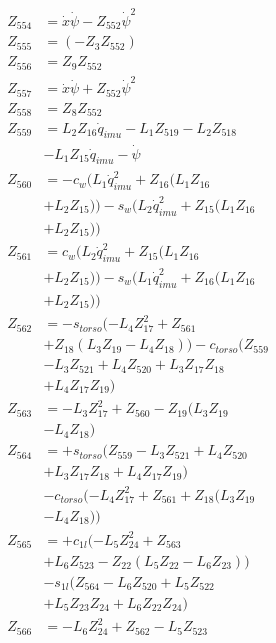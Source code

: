 \begin{multicols}{2}
\begin{align}
Z_{554} &= \dot{x}\dot{\psi} - Z_{552}\dot{\psi}^2 \nonumber \\
Z_{555} &= (-Z_{3}Z_{552}) \nonumber \\
Z_{556} &= Z_{9}Z_{552} \nonumber \\
Z_{557} &= \dot{x}\dot{\psi} + Z_{552}\dot{\psi}^2 \nonumber \\
Z_{558} &= Z_{8}Z_{552} \nonumber \\
Z_{559} &= L_2Z_{16}\dot{q}_{imu} - L_1Z_{519} - L_2Z_{518}  \nonumber \\
&- L_1Z_{15}\dot{q}_{imu} - \dot{\psi} \nonumber \\
Z_{560} &= - c_{w}(L_1\dot{q}_{imu}^2 + Z_{16}(L_1Z_{16}  \nonumber \\
&+ L_2Z_{15})) - s_{w}(L_2\dot{q}_{imu}^2 + Z_{15}(L_1Z_{16}  \nonumber \\
&+ L_2Z_{15})) \nonumber \\
Z_{561} &= c_{w}(L_2\dot{q}_{imu}^2 + Z_{15}(L_1Z_{16}  \nonumber \\
&+ L_2Z_{15})) - s_{w}(L_1\dot{q}_{imu}^2 + Z_{16}(L_1Z_{16}  \nonumber \\
&+ L_2Z_{15})) \nonumber \\
Z_{562} &= - s_{torso}(- L_4Z_{17}^2 + Z_{561}  \nonumber \\
&+ Z_{18}(L_3Z_{19} - L_4Z_{18})) - c_{torso}(Z_{559}  \nonumber \\
&- L_3Z_{521} + L_4Z_{520} + L_3Z_{17}Z_{18}  \nonumber \\
&+ L_4Z_{17}Z_{19}) \nonumber \\
Z_{563} &= - L_3Z_{17}^2 + Z_{560} - Z_{19}(L_3Z_{19}  \nonumber \\
&- L_4Z_{18}) \nonumber \\
Z_{564} &= + s_{torso}(Z_{559} - L_3Z_{521} + L_4Z_{520}  \nonumber \\
&+ L_3Z_{17}Z_{18} + L_4Z_{17}Z_{19})  \nonumber \\
&- c_{torso}(- L_4Z_{17}^2 + Z_{561} + Z_{18}(L_3Z_{19}  \nonumber \\
&- L_4Z_{18})) \nonumber \\
Z_{565} &=  + c_{1l}(- L_5Z_{24}^2 + Z_{563}  \nonumber \\
&+ L_6Z_{523} - Z_{22}(L_5Z_{22} - L_6Z_{23}))  \nonumber \\
&- s_{1l}(Z_{564} - L_6Z_{520} + L_5Z_{522}  \nonumber \\
&+ L_5Z_{23}Z_{24} + L_6Z_{22}Z_{24}) \nonumber \\
Z_{566} &= - L_6Z_{24}^2 + Z_{562} - L_5Z_{523}  \nonumber \\

\end{align}
\end{multicols}
